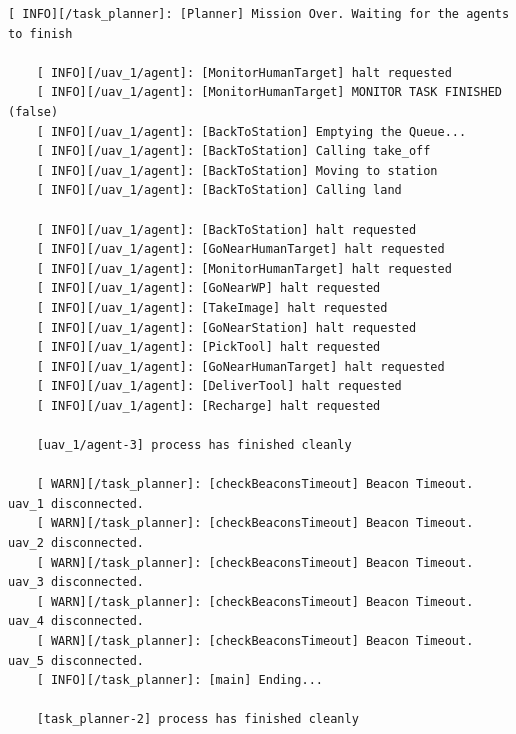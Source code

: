 \begin{lstlisting}[caption={Feedback messages printed after the mission's end has been communicated}, breaklines=true, label=exit:MissionOver]
    [ INFO][/task_planner]: [Planner] Mission Over. Waiting for the agents to finish

    [ INFO][/uav_1/agent]: [MonitorHumanTarget] halt requested
    [ INFO][/uav_1/agent]: [MonitorHumanTarget] MONITOR TASK FINISHED (false)
    [ INFO][/uav_1/agent]: [BackToStation] Emptying the Queue...
    [ INFO][/uav_1/agent]: [BackToStation] Calling take_off
    [ INFO][/uav_1/agent]: [BackToStation] Moving to station
    [ INFO][/uav_1/agent]: [BackToStation] Calling land

    [ INFO][/uav_1/agent]: [BackToStation] halt requested
    [ INFO][/uav_1/agent]: [GoNearHumanTarget] halt requested
    [ INFO][/uav_1/agent]: [MonitorHumanTarget] halt requested
    [ INFO][/uav_1/agent]: [GoNearWP] halt requested
    [ INFO][/uav_1/agent]: [TakeImage] halt requested
    [ INFO][/uav_1/agent]: [GoNearStation] halt requested
    [ INFO][/uav_1/agent]: [PickTool] halt requested
    [ INFO][/uav_1/agent]: [GoNearHumanTarget] halt requested
    [ INFO][/uav_1/agent]: [DeliverTool] halt requested
    [ INFO][/uav_1/agent]: [Recharge] halt requested

    [uav_1/agent-3] process has finished cleanly

    [ WARN][/task_planner]: [checkBeaconsTimeout] Beacon Timeout. uav_1 disconnected.
    [ WARN][/task_planner]: [checkBeaconsTimeout] Beacon Timeout. uav_2 disconnected.
    [ WARN][/task_planner]: [checkBeaconsTimeout] Beacon Timeout. uav_3 disconnected.
    [ WARN][/task_planner]: [checkBeaconsTimeout] Beacon Timeout. uav_4 disconnected.
    [ WARN][/task_planner]: [checkBeaconsTimeout] Beacon Timeout. uav_5 disconnected.
    [ INFO][/task_planner]: [main] Ending...
    
    [task_planner-2] process has finished cleanly
\end{lstlisting}